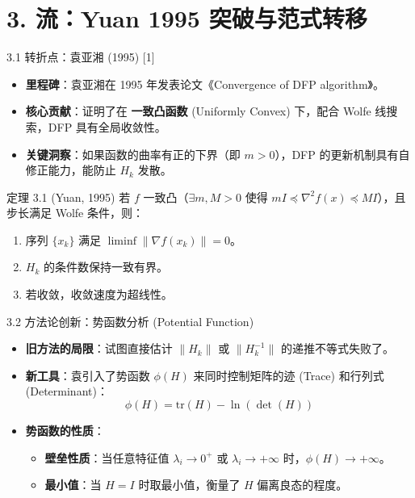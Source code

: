 \documentclass[11pt,hyperref={pdfpagelabels=false}]{beamer}
\begin{document}
\section{3. 流：Yuan 1995 突破与范式转移}

\begin{frame}{3.1 转折点：袁亚湘 (1995) [1]}
    \begin{itemize}
        \item \textbf{里程碑}：袁亚湘在 1995 年发表论文《Convergence of DFP algorithm》。
        \item \textbf{核心贡献}：证明了在 \textbf{一致凸函数} (Uniformly Convex) 下，配合 Wolfe 线搜索，DFP 具有全局收敛性。
        \item \textbf{关键洞察}：如果函数的曲率有正的下界（即 $m > 0$），DFP 的更新机制具有自修正能力，能防止 $H_k$ 发散。
    \end{itemize}
    \begin{block}{定理 3.1 (Yuan, 1995)}
        若 $f$ 一致凸（$\exists m, M > 0$ 使得 $mI \preceq \nabla^2 f(x) \preceq MI$），且步长满足 Wolfe 条件，则：
        \begin{enumerate}
            \item 序列 $\{x_k\}$ 满足 $\liminf \|\nabla f(x_k)\| = 0$。
            \item $H_k$ 的条件数保持一致有界。
            \item 若收敛，收敛速度为超线性。
        \end{enumerate}
    \end{block}
\end{frame}

\begin{frame}{3.2 方法论创新：势函数分析 (Potential Function)}
    \begin{itemize}
        \item \textbf{旧方法的局限}：试图直接估计 $\|H_k\|$ 或 $\|H_k^{-1}\|$ 的递推不等式失败了。
        \item \textbf{新工具}：袁引入了势函数 $\phi(H)$ 来同时控制矩阵的迹 (Trace) 和行列式 (Determinant)：
            \begin{equation*}
                \phi(H) = \text{tr}(H) - \ln(\det(H))
            \end{equation*}
        \item \textbf{势函数的性质}：
        \begin{itemize}
            \item \textbf{壁垒性质}：当任意特征值 $\lambda_i \to 0^+$ 或 $\lambda_i \to +\infty$ 时，$\phi(H) \to +\infty$。
            \item \textbf{最小值}：当 $H=I$ 时取最小值，衡量了 $H$ 偏离良态的程度。
        \end{itemize}
    \end{itemize}
\end{frame}
\end{document}

